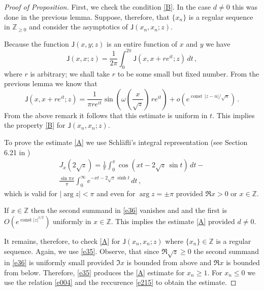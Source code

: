 \documentclass[12pt]{amsart}
\newcommand{\J}{\mathsf{J}}
\newcommand{\Z}{\mathbb{Z}}
\newcommand{\const}{\operatorname{const}}
\theoremstyle{plain}
\theoremstyle{definition}
\numberwithin{equation}{section}
\begin{document}
 
\begin{proof}[Proof of Proposition] First, we check the condition \eqref{B}. In the case
$d\ne 0$ this was done in the previous lemma.  Suppose, therefore,
that $\{x_n\}$ is a regular sequence in $\Z_{\ge 0}$ and
consider the asymptotics of $\J(x_n,x_n;z)$.

Because the function $\J(x,y;z)$ is an entire function of $x$ and $y$ we have
%
\begin{equation}\label{e35}
\J(x,x;z) = \frac1{2\pi} \int_0^{2\pi} \J\left(x,x+r e^{i t};z\right) \, dt \,,  
\end{equation}
%
where $r$ is arbitrary; we shall take $r$ to be some small but fixed
number. From the previous lemma we know that 
%
\begin{equation*}
\J\left(x,x+r e^{i t};z\right)=
\frac1{\pi r e^{it}}
\sin\left(\omega\left(\frac{x}{\sqrt{z}}\right)\, re^{it}\right)
 + o\left(e^{\const\, |z-n|/\sqrt{n}}\right) \,.
\end{equation*}
%
{}From the above remark it follows that this estimate is uniform in $t$.
This implies the property \eqref{B} for 
$\J(x_n,x_n;z)$. 

To prove the estimate \eqref{A} we use 
Schl\"afli's integral representation (see Section 6.21 in \cite{W})
%
\begin{multline}\label{e36}
J_x(2\sqrt{z})=\frac1\pi \int_0^\pi \cos
\left(x t - 2 \sqrt{z} \, \sin t\right) \, dt - \\
\frac{\sin \pi x}{\pi} \int_0^\infty e^{-x t -2\sqrt{z} \, \sinh t} \, dt \,, 
\end{multline}
%
which is valid for $|\arg z|<\pi$ and even for $\arg z=\pm \pi$ 
provided $\Re x>0$ or $x\in\Z$. 

If $x\in\Z$ then the second summand in \eqref{e36}
vanishes and and the first is $O\left(e^{\const|z|^{1/2}}\right)$ uniformly
in $x\in\Z$. This implies the estimate \eqref{A} 
provided $d\ne 0$. 

It remains, therefore, to check \eqref{A} for $\J(x_n,x_n;z)$ where
$\{x_n\}\in\Z$ is a regular sequence. Again, we use 
\eqref{e35}. Observe, that since $\Re\sqrt{z}\ge 0$ 
the second summand  in \eqref{e36} is uniformly small
provided $\Im x$ is bounded from above and $\Re x$ is bounded
from below. Therefore, \eqref{e35} produces the \eqref{A} estimate 
for $x_n\ge 1$. For $x_n\le 0$ we use the relation \eqref{e004} and 
the reccurence \eqref{e215} to obtain the estimate.  
\end{proof}
  
\end{document}
